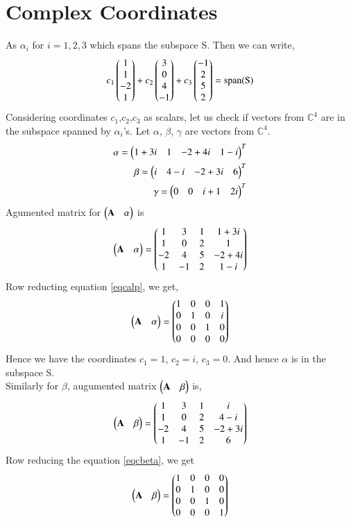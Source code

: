 \documentclass[journal,12pt,twocolumn]{IEEEtran}
\begin{document}
\section{Complex Coordinates}
As $\alpha_i$ for $i=1,2,3$ which spans the subspace S. Then we can write,
\begin{align}
c_1\begin{pmatrix}1\\1\\-2\\1\end{pmatrix}+c_2\begin{pmatrix}3\\0\\4\\-1\end{pmatrix}+c_3\begin{pmatrix}-1\\2\\5\\2\end{pmatrix}=\text{span(S)}
\end{align}
Considering coordinates $c_1$,$c_2$,$c_3$ as scalars, let us check if vectors from $\mathbb{C}^4$ are in the subspace spanned by $\alpha_i$'s.
Let $\alpha$, $\beta$, $\gamma$ are vectors from $\mathbb{C}^4$.
\begin{align}
\alpha=\begin{pmatrix}1+3i&1&-2+4i&1-i\end{pmatrix}^T\\
\beta=\begin{pmatrix}i&4-i&-2+3i&6\end{pmatrix}^T\\
\gamma=\begin{pmatrix}0&0&i+1&2i\end{pmatrix}^T
\end{align}
 Agumented matrix for $\begin{pmatrix}\mathbf{A}&\alpha\end{pmatrix}$ is
\begin{align}\label{eqcalp}
\begin{pmatrix}\mathbf{A}&\alpha\end{pmatrix}=\begin{pmatrix}1&3&1&1+3i\\1&0&2&1\\-2&4&5&-2+4i\\1&-1&2&1-i\end{pmatrix} 
\end{align}
Row reducting equation \eqref{eqcalp}, we get,
\begin{align}
\begin{pmatrix}\mathbf{A}&\alpha\end{pmatrix}=\begin{pmatrix}1&0&0&1\\0&1&0&i\\0&0&1&0\\0&0&0&0\end{pmatrix}
\end{align}
Hence we have the coordinates $c_1=1$, $c_2=i$, $c_3=0$. And hence $\alpha$ is in the subspace S.\\
 Similarly for $\beta$, augumented matrix $\begin{pmatrix}\mathbf{A}&\beta\end{pmatrix}$ is,
\begin{align}\label{eqcbeta}
\begin{pmatrix}\mathbf{A}&\beta\end{pmatrix}=\begin{pmatrix}1&3&1&i\\1&0&2&4-i\\-2&4&5&-2+3i\\1&-1&2&6\end{pmatrix} 
\end{align}
Row reducing the equation \eqref{eqcbeta}, we get
\begin{align}
\begin{pmatrix}\mathbf{A}&\beta\end{pmatrix}= \begin{pmatrix}1&0&0&0\\0&1&0&0\\0&0&1&0\\0&0&0&1\end{pmatrix}
\end{align}
\end{document}

